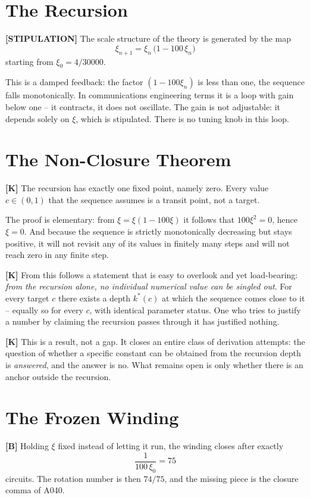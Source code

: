 \section{The Recursion}

\textbf{[STIPULATION]} The scale structure of the theory is generated by the map
\[
  \xi_{n+1} = \xi_n\,\bigl(1 - 100\,\xi_n\bigr)
\]
starting from $\xi_0 = 4/30000$.

This is a damped feedback: the factor $(1-100\xi_n)$ is less than one, the
sequence falls monotonically. In communications engineering terms it is a loop
with gain below one -- it contracts, it does not oscillate. The gain is not
adjustable: it depends solely on $\xi$, which is stipulated. There is no tuning
knob in this loop.

\section{The Non-Closure Theorem}

\textbf{[K]} The recursion has exactly one fixed point, namely zero. Every
value $c \in (0,1)$ that the sequence assumes is a transit point, not a target.

The proof is elementary: from $\xi = \xi(1-100\xi)$ it follows that $100\xi^2 = 0$,
hence $\xi = 0$. And because the sequence is strictly monotonically decreasing
but stays positive, it will not revisit any of its values in finitely many steps
and will not reach zero in any finite step.

\textbf{[K]} From this follows a statement that is easy to overlook and yet
load-bearing: \emph{from the recursion alone, no individual numerical value can
be singled out}. For every target $c$ there exists a depth $k^*(c)$ at which
the sequence comes close to it -- equally so for every $c$, with identical
parameter status. One who tries to justify a number by claiming the recursion
passes through it has justified nothing.

\textbf{[K]} This is a result, not a gap. It closes an entire class of derivation
attempts: the question of whether a specific constant can be obtained from the
recursion depth is \emph{answered}, and the answer is no. What remains open is
only whether there is an anchor outside the recursion.

\section{The Frozen Winding}

\textbf{[B]} Holding $\xi$ fixed instead of letting it run, the winding closes
after exactly
\[
  \frac{1}{100\,\xi_0} = 75
\]
circuits. The rotation number is then $74/75$, and the missing piece is the
closure comma of A040.

